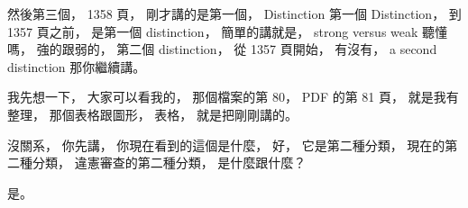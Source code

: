 \hypertarget{w06:cue:1012}{}然後第三個，
\hypertarget{w06:cue:1013}{}1358 頁，
\hypertarget{w06:cue:1014}{}剛才講的是第一個，
\hypertarget{w06:cue:1015}{}Distinction
\hypertarget{w06:cue:1016}{}第一個 Distinction，
\hypertarget{w06:cue:1017}{}到 1357 頁之前，
\hypertarget{w06:cue:1018}{}是第一個 distinction，
\hypertarget{w06:cue:1019}{}簡單的講就是，
\hypertarget{w06:cue:1020}{}strong versus weak
\hypertarget{w06:cue:1021}{}聽懂嗎，
\hypertarget{w06:cue:1022}{}強的跟弱的，
\hypertarget{w06:cue:1023}{}第二個 distinction，
\hypertarget{w06:cue:1024}{}從 1357 頁開始，
\hypertarget{w06:cue:1025}{}有沒有，
\hypertarget{w06:cue:1026}{}a second distinction
\hypertarget{w06:cue:1027}{}那你繼續講。

\hypertarget{w06:cue:1028}{}我先想一下，
\hypertarget{w06:cue:1029}{}大家可以看我的，
\hypertarget{w06:cue:1030}{}那個檔案的第 80，
\hypertarget{w06:cue:1031}{}PDF 的第 81 頁，
\hypertarget{w06:cue:1032}{}就是我有整理，
\hypertarget{w06:cue:1033}{}那個表格跟圖形，
\hypertarget{w06:cue:1034}{}表格，
\hypertarget{w06:cue:1035}{}就是把剛剛講的。

\hypertarget{w06:cue:1036}{}沒關系，
\hypertarget{w06:cue:1037}{}你先講，
\hypertarget{w06:cue:1038}{}你現在看到的這個是什麼，
\hypertarget{w06:cue:1039}{}好，
\hypertarget{w06:cue:1040}{}它是第二種分類，
\hypertarget{w06:cue:1041}{}現在的第二種分類，
\hypertarget{w06:cue:1042}{}違憲審查的第二種分類，
\hypertarget{w06:cue:1043}{}是什麼跟什麼？

\hypertarget{w06:cue:1044}{}是。

